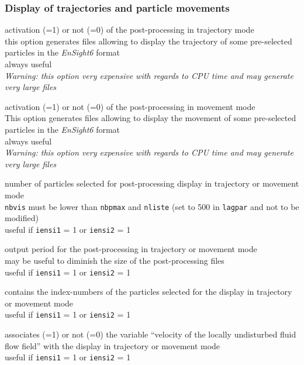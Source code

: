\subsubsection{Display of trajectories and particle movements}

{activation (=1) or not (=0) of the post-processing in trajectory mode\\
this option generates files allowing to display the trajectory of
some pre-selected particles in the \textit{EnSight6} format\\
always useful\\
{\em Warning: this option very expensive with regards to CPU time and may
generate very large files}}

{activation (=1) or not (=0) of the post-processing in movement
mode\\
This option generates files allowing to display the movement of
some pre-selected particles in the \textit{EnSight6} format\\
always useful\\
{\em Warning: this option very expensive with regards to CPU time and may
generate very large files}}

{number of particles selected for post-processing display in trajectory or
movement mode\\
\texttt{nbvis} must be lower than \texttt{nbpmax} and \texttt{nliste}
(set to 500 in \texttt{lagpar} and
not to be modified)\\
useful if \texttt{iensi1} = 1 or \texttt{iensi2} = 1}

{output period for the post-processing in trajectory or
movement mode\\
may be useful to diminish the size of the post-processing files\\
useful if \texttt{iensi1} = 1 or \texttt{iensi2} = 1}

{contains the index-numbers of the particles selected for the display in
trajectory or movement mode\\
useful if \texttt{iensi1} = 1 or \texttt{iensi2} = 1}

{associates (=1) or not (=0) the variable ``velocity of the locally
undisturbed fluid flow field'' with the display in trajectory or
movement mode\\
useful if \texttt{iensi1} = 1 or \texttt{iensi2} = 1}

